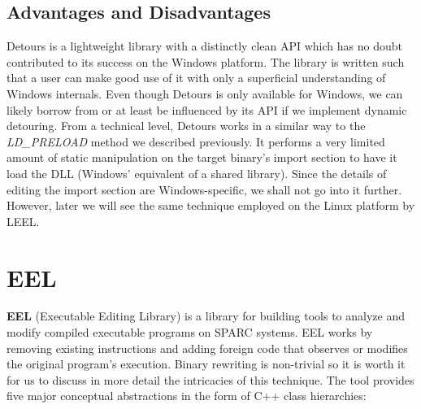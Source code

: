 \subsection{Advantages and Disadvantages}

Detours is a lightweight library with a distinctly clean API which has no doubt contributed to its success on the Windows platform. The library is written such that a user can make good use of it with only a superficial understanding of Windows internals. Even though Detours is only available for Windows, we can likely borrow from or at least be influenced by its API if we implement dynamic detouring. From a technical level, Detours works in a similar way to the \emph{LD\_PRELOAD} method we described previously. It performs a very limited amount of static manipulation on the target binary's import section to have it load the DLL (Windows' equivalent of a shared library). Since the details of editing the import section are Windows-specific, we shall not go into it further. However, later we will see the same technique employed on the Linux platform by LEEL.

\section{EEL}

\textbf{EEL} (Executable Editing Library) is a library for building tools to analyze and modify compiled executable programs on SPARC systems\cite{eel}. EEL works by removing existing instructions and adding foreign code that observes or modifies the original program's execution. Binary rewriting is non-trivial so it is worth it for us to discuss in more detail the intricacies of this technique. The tool provides five major conceptual abstractions in the form of C++ class hierarchies:

